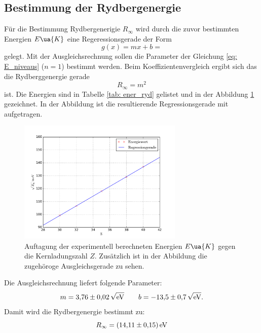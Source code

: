 \subsection{Bestimmung der Rydbergenergie}
Für die Bestimmung Rydbergenerigie $R_\infty$ wird durch die zuvor
bestimmten Energien $E\ua{K}$ eine Regeressionsgerade der Form
\begin{equation*}
  g(x)=mx+b=
\end{equation*}
gelegt. Mit der Ausgleichsrechnung sollen die Parameter der Gleichung \eqref{eq: E_niveaus} ($n=1$)
bestimmt werden. Beim Koeffizientenvergleich ergibt sich das die Rydberggenergie
gerade
\begin{equation*}
  R_\infty=m^2
\end{equation*}
ist.
Die Energien sind in Tabelle \ref{tab: ener_ryd} gelistet
und in der Abbildung \ref{fig: ryd_ener} gezeichnet. In der Abbildung ist
die resultierende Regressionsgerade mit aufgetragen.

\begin{figure}
  \centering
  \includegraphics[width=0.7\textwidth]{../Messdaten/energie_z.pdf}
  \caption{Auftagung der experimentell berechneten Energien $E\ua{K}$ gegen die Kernladungszahl $Z$. Zusätzlich ist in der Abbildung die zugehöroge Ausgleichsgerade zu sehen. } %
  \label{fig: ryd_ener}
\end{figure}
Die Ausgleichsrechnung liefert folgende Parameter:
\begin{equation*}
m=\num{3.76\pm0.02}\,\sqrt{\si{\eV}} \qquad b=\num{-13.5\pm0.7}\,\sqrt{\si{\eV}}.
\end{equation*}
Damit wird die Rydbergenergie bestimmt zu:
\begin{equation}
  R_\infty=\SI{14.11\pm0.15}{\eV}
\end{equation}
